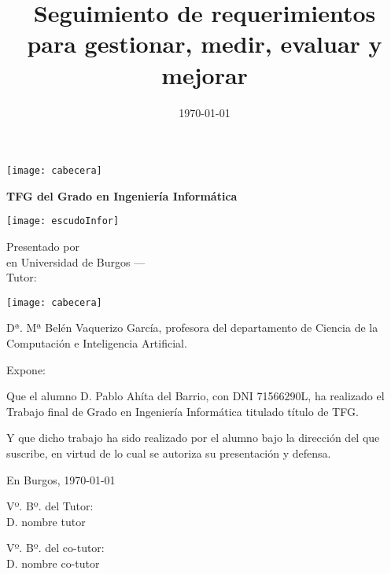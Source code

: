 \documentclass[a4paper,12pt,twoside]{memoir}
\title{ Seguimiento de requerimientos para gestionar, medir, evaluar y mejorar}
\author{\nombre}
\date{\today}
\makeatletter
\def\maketitle{
  \null
  \thispagestyle{empty}
\noindent\texttt{[image: cabecera]}\vspace{1cm}%
  \vfill
  \colorbox{cpardoBox}{%
    \begin{minipage}{.8\textwidth}
      \vspace{.5cm}\Large
      \begin{center}
      \textbf{TFG del Grado en Ingeniería Informática}\vspace{.6cm}\\
      \textbf{\LARGE\@title{}}
      \end{center}
      \vspace{.2cm}
    \end{minipage}

  }%
  \hfill\begin{minipage}{.20\textwidth}
    \texttt{[image: escudoInfor]}
  \end{minipage}
  \vfill
  \begin{center}%
  {%
    \noindent\LARGE
    Presentado por \@author{}\\ 
    en Universidad de Burgos --- \@date{}\\
    Tutor: \@tutor{}\\
  }%
  \end{center}%
  \null
  \cleardoublepage
  }
\newcommand{\nombre}{Pablo Ahíta del Barrio} %
\newcommand{\dni}{71566290L}
\makeatother
\begin{document}
\maketitle


\newpage\null\thispagestyle{empty}\newpage


\thispagestyle{empty}


\noindent\texttt{[image: cabecera]}\vspace{1cm}

\noindent Dª. Mª Belén Vaquerizo García, profesora del departamento de Ciencia de la Computación e Inteligencia Artificial.

\noindent Expone:

\noindent Que el alumno D. \nombre, con DNI \dni, ha realizado el Trabajo final de Grado en Ingeniería Informática titulado título de TFG. 

\noindent Y que dicho trabajo ha sido realizado por el alumno bajo la dirección del que suscribe, en virtud de lo cual se autoriza su presentación y defensa.

\begin{center} %
En Burgos, {\large \today}
\end{center}

\vfill\vfill\vfill

\begin{minipage}{0.45\textwidth}
\begin{flushleft} %
Vº. Bº. del Tutor:\\[2cm]
D. nombre tutor
\end{flushleft}
\end{minipage}
\hfill
\begin{minipage}{0.45\textwidth}
\begin{flushleft} %
Vº. Bº. del co-tutor:\\[2cm]
D. nombre co-tutor
\end{flushleft}
\end{minipage}
\hfill

\vfill



\newpage\null\thispagestyle{empty}\newpage




\frontmatter
\end{document}
